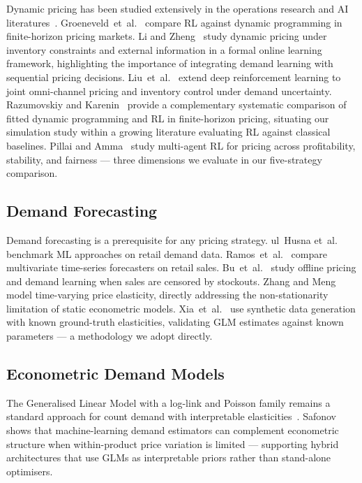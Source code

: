\documentclass[journal, 10pt, twoside]{IEEEtran}
\begin{document}
Dynamic pricing has been studied extensively in the operations research
and AI literatures~\cite{kopalle2023, chenavaz2025}.
Groeneveld~et~al.~\cite{groeneveld2025} compare RL against dynamic
programming in finite-horizon pricing markets. Li and Zheng~\cite{xiaocheng2023}
study dynamic pricing under inventory constraints and external information
in a formal online learning framework, highlighting the importance of
integrating demand learning with sequential pricing decisions.
Liu~et~al.~\cite{liu2024} extend deep reinforcement learning to joint
omni-channel pricing and inventory control under demand uncertainty.
Razumovskiy and Karenin~\cite{razumovskiy2025} provide a complementary
systematic comparison of fitted dynamic programming and RL in
finite-horizon pricing, situating our simulation study within a growing
literature evaluating RL against classical baselines.
Pillai and Amma~\cite{kumar2026} study multi-agent RL for pricing across
profitability, stability, and fairness --- three dimensions we evaluate
in our five-strategy comparison.

\subsection{Demand Forecasting}

Demand forecasting is a prerequisite for any pricing strategy. ul~Husna
et~al.~\cite{husna2023} benchmark ML approaches on retail demand data.
Ramos~et~al.~\cite{ramos2023} compare multivariate time-series forecasters
on retail sales.
Bu~et~al.~\cite{bu2023} study offline pricing and demand learning when
sales are censored by stockouts.
Zhang and Meng~\cite{zhang2025} model time-varying price elasticity,
directly addressing the non-stationarity limitation of static econometric
models. Xia~et~al.~\cite{xia2023} use synthetic data generation with
known ground-truth elasticities, validating GLM estimates against known
parameters --- a methodology we adopt directly.

\subsection{Econometric Demand Models}

The Generalised Linear Model with a log-link and Poisson family remains
a standard approach for count demand with interpretable elasticities~\cite{zhang2025}.
Safonov~\cite{safonov2024} shows that machine-learning demand estimators
can complement econometric structure when within-product price variation
is limited --- supporting hybrid architectures that use GLMs as
interpretable priors rather than stand-alone optimisers.
\end{document}
